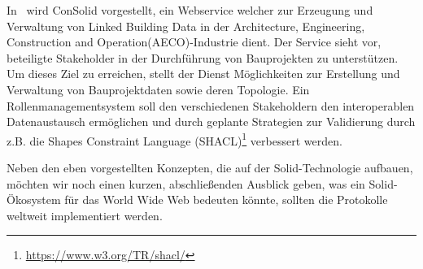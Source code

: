 \documentclass[acmtog]{acmart}
\begin{document}
In~\cite{8633673} wird ConSolid vorgestellt, ein Webservice welcher zur Erzeugung und Verwaltung von Linked Building Data in der Architecture, Engineering, Construction and Operation(AECO)-Industrie dient. Der Service sieht vor, beteiligte Stakeholder in der Durchführung von Bauprojekten zu unterstützen. Um dieses Ziel zu erreichen, stellt der Dienst Möglichkeiten zur Erstellung und Verwaltung von Bauprojektdaten sowie deren Topologie. Ein Rollenmanagementsystem soll den verschiedenen Stakeholdern den interoperablen Datenaustausch ermöglichen und durch geplante Strategien zur Validierung durch z.B. die Shapes Constraint Language (SHACL)\footnote{\url{https://www.w3.org/TR/shacl/}} verbessert werden.

Neben den eben vorgestellten Konzepten, die auf der Solid-Technologie aufbauen, möchten wir noch einen kurzen, abschließenden Ausblick geben, was ein Solid-Ökosystem für das World Wide Web bedeuten könnte, sollten die Protokolle weltweit implementiert werden. 





\appendix
\end{document}

